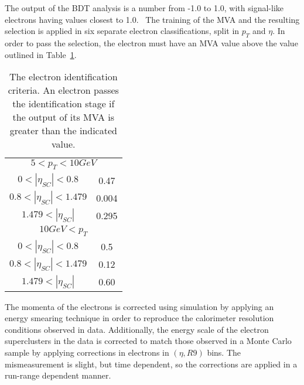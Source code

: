 \begin{sidewaystable}[h]
\begin{tabular}{|c|p{15cm}|}
\end{tabular}
\caption[List of electron variables used in the electron idendification MVA.]{List of electron variables used in the electron identification MVA.}
\label{tab:eleVars}
\end{sidewaystable}

\clearpage


The output of the BDT analysis is a number from -1.0 to 1.0, with signal-like
electrons having values closest to 1.0.~\cite{elePerformance}
The training of the MVA and the resulting selection is applied in six separate
electron classifications, split in $p_T$ and $\eta$. In order to pass the
selection, the electron must have an MVA value above the value outlined in
Table~\ref{tab:eleCuts}.


\begin{table}[h]
\centering
\begin{tabular}{|c|c|}
\hline
\multicolumn{2}{|c|}{$5 < p_{T} < 10 GeV$} \\
$0 < |\eta_{SC}| < 0.8 $ & 0.47\\
$0.8 < |\eta_{SC}| < 1.479 $ & 0.004\\
$1.479 < |\eta_{SC}| $& 0.295\\
\hline
\multicolumn{2}{|c|}{$10 GeV < p_{T}$} \\
$0 < |\eta_{SC}| < 0.8 $& 0.5\\
$0.8 < |\eta_{SC}| < 1.479 $& 0.12\\
$1.479 < |\eta_{SC}| $& 0.60\\
\hline
\end{tabular}
\caption[The electron identification criteria.]{The electron identification
criteria. An electron passes the identification stage if the output of its MVA
is greater than the indicated value.}
\label{tab:eleCuts}
\end{table}

The momenta of the electrons is corrected using simulation by applying an
energy smearing technique in order to reproduce the calorimeter resolution
conditions observed in data. Additionally, the energy scale of the electron
superclusters in the data is corrected to match those observed in a Monte Carlo
sample by applying corrections in electrons in $(\eta, R9)$ bins. The
mismeasurement is slight, but time dependent, so the corrections are applied in
a run-range dependent manner.

